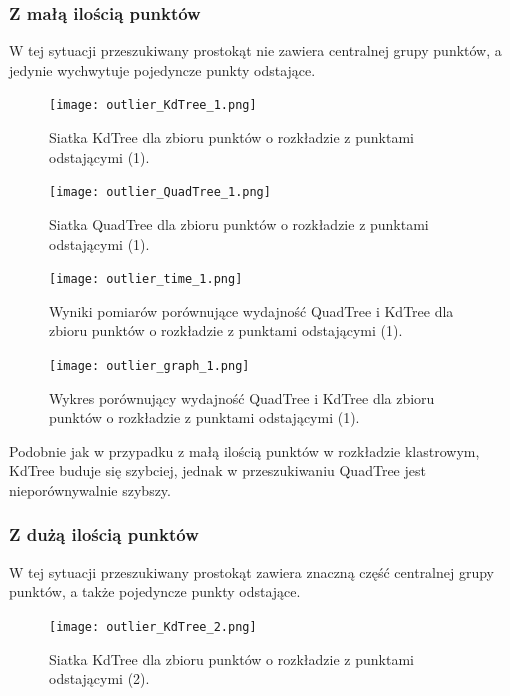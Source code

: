 \documentclass{lab}
\begin{document}
\subsubsection{Z małą ilością punktów}
W tej sytuacji przeszukiwany prostokąt nie zawiera centralnej grupy punktów, a jedynie wychwytuje pojedyncze punkty odstające.

\begin{figure}[H]
  \centering
  \texttt{[image: outlier\_KdTree\_1.png]}
  \caption{Siatka KdTree dla zbioru punktów o rozkładzie z punktami odstającymi (1).}
  \label{fig:outlier_KdTree_1}
\end{figure}

\begin{figure}[H]
  \centering
  \texttt{[image: outlier\_QuadTree\_1.png]}
  \caption{Siatka QuadTree dla zbioru punktów o rozkładzie z punktami odstającymi (1).}
  \label{fig:outlier_QuadTree_1}
\end{figure}

\begin{figure}[H]
  \centering
  \texttt{[image: outlier\_time\_1.png]}
  \caption{Wyniki pomiarów porównujące wydajność QuadTree i KdTree dla zbioru punktów o rozkładzie z punktami odstającymi (1).}
  \label{fig:outlier_time_1}
\end{figure}

\begin{figure}[H]
  \centering
  \texttt{[image: outlier\_graph\_1.png]}
  \caption{Wykres porównujący wydajność QuadTree i KdTree dla zbioru punktów o rozkładzie z punktami odstającymi (1).}
  \label{fig:outlier_graph_1}
\end{figure}

Podobnie jak w przypadku z małą ilością punktów w rozkładzie klastrowym, KdTree buduje się szybciej, jednak w przeszukiwaniu QuadTree jest nieporównywalnie szybszy.

\subsubsection{Z dużą ilością punktów}
W tej sytuacji przeszukiwany prostokąt zawiera znaczną część centralnej grupy punktów, a także pojedyncze punkty odstające.

\begin{figure}[H]
  \centering
  \texttt{[image: outlier\_KdTree\_2.png]}
  \caption{Siatka KdTree dla zbioru punktów o rozkładzie z punktami odstającymi (2).}
  \label{fig:outlier_KdTree_2}
\end{figure}
\end{document}
